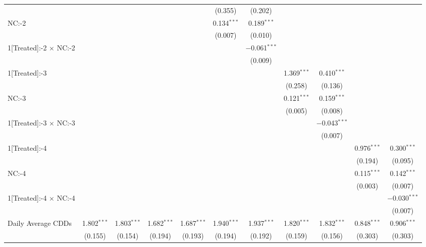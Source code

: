 \begin{table}[!htbp]
\begin{adjustbox}{scale = 0.75}
\begin{tabular}{@{\extracolsep{5pt}}lcccccccccc}
  &  &  &  &  & (0.355) & (0.202) &  &  &  &  \\ 
 NC:-2 &  &  &  &  & 0.134$^{***}$ & 0.189$^{***}$ &  &  &  &  \\ 
  &  &  &  &  & (0.007) & (0.010) &  &  &  &  \\ 
 1[Treated]:-2 $\times$ NC:-2 &  &  &  &  &  & $-$0.061$^{***}$ &  &  &  &  \\ 
  &  &  &  &  &  & (0.009) &  &  &  &  \\ 
 1[Treated]:-3 &  &  &  &  &  &  & 1.369$^{***}$ & 0.410$^{***}$ &  &  \\ 
  &  &  &  &  &  &  & (0.258) & (0.136) &  &  \\ 
 NC:-3 &  &  &  &  &  &  & 0.121$^{***}$ & 0.159$^{***}$ &  &  \\ 
  &  &  &  &  &  &  & (0.005) & (0.008) &  &  \\ 
 1[Treated]:-3 $\times$ NC:-3 &  &  &  &  &  &  &  & $-$0.043$^{***}$ &  &  \\ 
  &  &  &  &  &  &  &  & (0.007) &  &  \\ 
 1[Treated]:-4 &  &  &  &  &  &  &  &  & 0.976$^{***}$ & 0.300$^{***}$ \\ 
  &  &  &  &  &  &  &  &  & (0.194) & (0.095) \\ 
 NC:-4 &  &  &  &  &  &  &  &  & 0.115$^{***}$ & 0.142$^{***}$ \\ 
  &  &  &  &  &  &  &  &  & (0.003) & (0.007) \\ 
 1[Treated]:-4 $\times$ NC:-4 &  &  &  &  &  &  &  &  &  & $-$0.030$^{***}$ \\ 
  &  &  &  &  &  &  &  &  &  & (0.007) \\ 
 Daily Average CDDs & 1.802$^{***}$ & 1.803$^{***}$ & 1.682$^{***}$ & 1.687$^{***}$ & 1.940$^{***}$ & 1.937$^{***}$ & 1.820$^{***}$ & 1.832$^{***}$ & 0.848$^{***}$ & 0.906$^{***}$ \\ 
  & (0.155) & (0.154) & (0.194) & (0.193) & (0.194) & (0.192) & (0.159) & (0.156) & (0.303) & (0.303) \\ 

\end{tabular}
\end{adjustbox}
\end{table}
